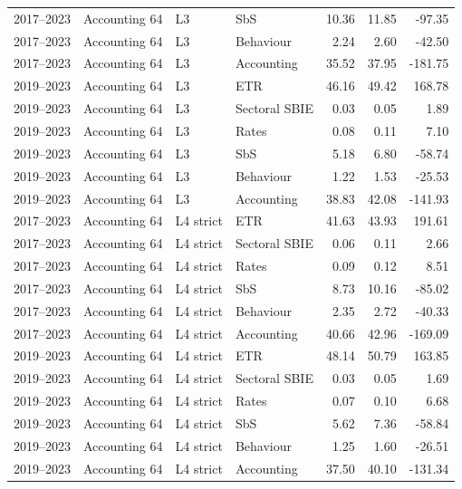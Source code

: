 \begin{table}[htbp]
\begin{tabular}{@{}llllrrr@{}}
2017–2023 & Accounting 64 & L3 & SbS & 10.36 & 11.85 &  -97.35 \\
2017–2023 & Accounting 64 & L3 & Behaviour &  2.24 &  2.60 &  -42.50 \\
2017–2023 & Accounting 64 & L3 & Accounting & 35.52 & 37.95 & -181.75 \\
2019–2023 & Accounting 64 & L3 & ETR & 46.16 & 49.42 &  168.78 \\
2019–2023 & Accounting 64 & L3 & Sectoral SBIE &  0.03 &  0.05 &    1.89 \\
2019–2023 & Accounting 64 & L3 & Rates &  0.08 &  0.11 &    7.10 \\
2019–2023 & Accounting 64 & L3 & SbS &  5.18 &  6.80 &  -58.74 \\
2019–2023 & Accounting 64 & L3 & Behaviour &  1.22 &  1.53 &  -25.53 \\
2019–2023 & Accounting 64 & L3 & Accounting & 38.83 & 42.08 & -141.93 \\
2017–2023 & Accounting 64 & L4 strict & ETR & 41.63 & 43.93 &  191.61 \\
2017–2023 & Accounting 64 & L4 strict & Sectoral SBIE &  0.06 &  0.11 &    2.66 \\
2017–2023 & Accounting 64 & L4 strict & Rates &  0.09 &  0.12 &    8.51 \\
2017–2023 & Accounting 64 & L4 strict & SbS &  8.73 & 10.16 &  -85.02 \\
2017–2023 & Accounting 64 & L4 strict & Behaviour &  2.35 &  2.72 &  -40.33 \\
2017–2023 & Accounting 64 & L4 strict & Accounting & 40.66 & 42.96 & -169.09 \\
2019–2023 & Accounting 64 & L4 strict & ETR & 48.14 & 50.79 &  163.85 \\
2019–2023 & Accounting 64 & L4 strict & Sectoral SBIE &  0.03 &  0.05 &    1.69 \\
2019–2023 & Accounting 64 & L4 strict & Rates &  0.07 &  0.10 &    6.68 \\
2019–2023 & Accounting 64 & L4 strict & SbS &  5.62 &  7.36 &  -58.84 \\
2019–2023 & Accounting 64 & L4 strict & Behaviour &  1.25 &  1.60 &  -26.51 \\
2019–2023 & Accounting 64 & L4 strict & Accounting & 37.50 & 40.10 & -131.34 \\
\bottomrule
\end{tabular}
\par\vspace{0.6em}
\begin{tabular}{@{}llrrrr@{}}

\end{tabular}
\end{table}
